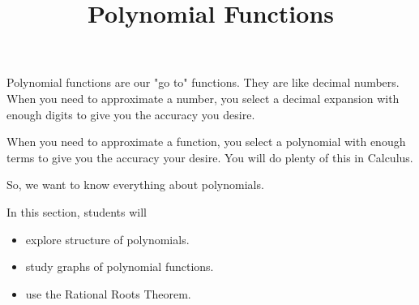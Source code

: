\documentclass{ximera}
\title{Polynomial Functions}
\begin{document}
\begin{abstract}
\end{abstract}
\maketitle






Polynomial functions are our "go to" functions.  They are like decimal numbers.  When you need to approximate a number, you select a decimal expansion with enough digits to give you the accuracy you desire.

When you need to approximate a function, you select a polynomial with enough terms to give you the accuracy your desire. You will do plenty of this in Calculus.

So, we want to know everything about polynomials.


















\begin{sectionOutcomes}
In this section, students will 

\begin{itemize}
\item explore structure of polynomials.
\item study graphs of polynomial functions.
\item use the Rational Roots Theorem.
\end{itemize}
\end{sectionOutcomes}
\end{document}
